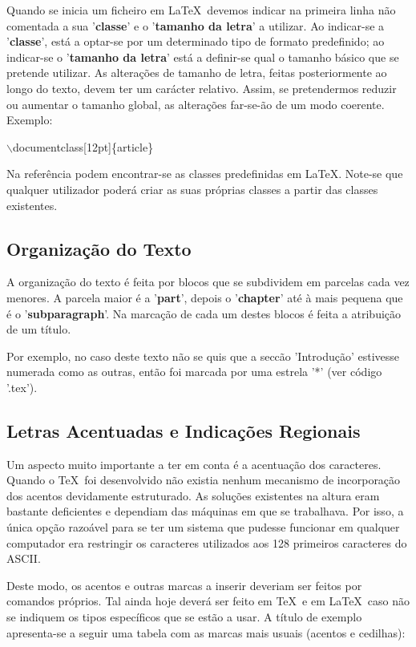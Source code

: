 \documentclass[a4paper,12pt]{article}
\begin{document}
Quando se inicia um ficheiro em \LaTeX\ devemos indicar 
na primeira linha não comentada a sua '{\bf classe}'
e o '{\bf tamanho da letra}' a utilizar. 
Ao indicar-se a '{\bf classe}',
está a optar-se por um determinado tipo de formato predefinido; ao indicar-se
o '{\bf tamanho da letra}' está a definir-se qual o tamanho básico que se
pretende utilizar. As alterações de tamanho de letra, feitas 
posteriormente ao longo do texto, devem ter um carácter relativo. 
Assim, se pretendermos
reduzir ou aumentar o tamanho global, as alterações far-se-ão de um
modo coerente. Exemplo: 
\vskip 2mm\par
$\backslash$documentclass[12pt]\{article\}
\vskip 2mm\par
Na referência\cite{LaTeX:Wiki} podem encontrar-se as classes predefinidas
em \LaTeX.
Note-se que qualquer utilizador poderá criar as suas próprias classes 
a partir das classes existentes.

\subsection{Organização do Texto}

A organização do texto é feita por blocos que se subdividem
em parcelas cada vez menores. A parcela maior é a '{\bf part}',
depois o '{\bf chapter}' até à mais pequena que é o
'{\bf subparagraph}'. Na marcação de cada um destes blocos
é feita a atribuição de um título.

Por exemplo, no caso deste texto não se quis que a seccão 'Introdução'
estivesse numerada como as outras, então foi marcada por uma estrela '*'
(ver código '.tex').

\subsection{Letras Acentuadas e Indicações Regionais}

Um aspecto muito importante a ter em conta é a acentuação dos caracteres.
Quando o \TeX\ foi desenvolvido não existia nenhum mecanismo de incorporação
dos acentos devidamente estruturado. As soluções existentes na altura
eram bastante deficientes e dependiam das máquinas em que se
trabalhava. Por isso, a única opção razoável para se ter um sistema
que pudesse funcionar em qualquer computador era restringir os caracteres
utilizados aos 128 primeiros caracteres do ASCII.

Deste modo, os acentos e outras marcas a inserir deveriam ser feitos
por comandos próprios. Tal ainda hoje deverá ser feito em \TeX\ e 
em \LaTeX\ caso não se indiquem os tipos específicos que se estão
a usar. A título de exemplo apresenta-se a seguir uma tabela com
as marcas mais usuais (acentos e cedilhas):
\end{document}
